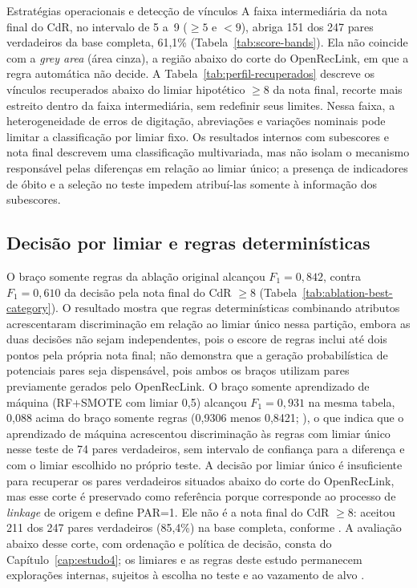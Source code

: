 \begin{chapter}{Estratégias operacionais e detecção de vínculos}
A faixa intermediária da nota final do CdR, no intervalo de 5 a~9 ($\geq 5$ e $< 9$), abriga 151 dos 247 pares verdadeiros da base completa, 61,1\% (Tabela~\ref{tab:score-bands}). Ela não coincide com a \textit{grey area} (área cinza), a região abaixo do corte do OpenRecLink, em que a regra automática não decide. A Tabela~\ref{tab:perfil-recuperados} descreve os vínculos recuperados abaixo do limiar hipotético $\geq 8$ da nota final, recorte mais estreito dentro da faixa intermediária, sem redefinir seus limites. Nessa faixa, a heterogeneidade de erros de digitação, abreviações e variações nominais pode limitar a classificação por limiar fixo. Os resultados internos com subescores e nota final descrevem uma classificação multivariada, mas não isolam o mecanismo responsável pelas diferenças em relação ao limiar único; a presença de indicadores de óbito e a seleção no teste impedem atribuí-las somente à informação dos subescores.

\subsection{Decisão por limiar e regras determinísticas}\label{sec:e3-limiar-regras}

O braço somente regras da ablação original alcançou $F_1=0{,}842$, contra $F_1=0{,}610$ da decisão pela nota final do CdR $\geq 8$ (Tabela~\ref{tab:ablation-best-category}). O resultado mostra que regras determinísticas combinando atributos acrescentaram discriminação em relação ao limiar único nessa partição, embora as duas decisões não sejam independentes, pois o escore de regras inclui até dois pontos pela própria nota final; não demonstra que a geração probabilística de potenciais pares seja dispensável, pois ambos os braços utilizam pares previamente gerados pelo OpenRecLink. O braço somente aprendizado de máquina (RF+SMOTE com limiar 0,5) alcançou $F_1=0{,}931$ na mesma tabela, 0,088 acima do braço somente regras (0,9306 menos 0,8421; ), o que indica que o aprendizado de máquina acrescentou discriminação às regras com limiar único nesse teste de 74 pares verdadeiros, sem intervalo de confiança para a diferença e com o limiar escolhido no próprio teste. A decisão por limiar único é insuficiente para recuperar os pares verdadeiros situados abaixo do corte do OpenRecLink, mas esse corte é preservado como referência porque corresponde ao processo de \textit{linkage} de origem e define PAR=1. Ele não é a nota final do CdR $\geq 8$: aceitou 211 dos 247 pares verdadeiros (85,4\%) na base completa, conforme . A avaliação abaixo desse corte, com ordenação e política de decisão, consta do Capítulo~\ref{cap:estudo4}; os limiares e as regras deste estudo permanecem explorações internas, sujeitos à escolha no teste e ao vazamento de alvo \cite{Jardim2026phdrepo}.


\end{chapter}
